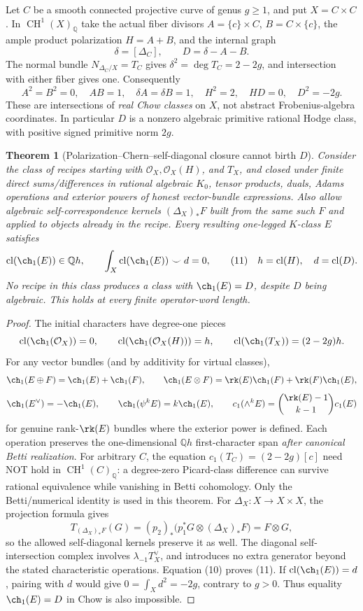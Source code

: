 \documentclass[11pt]{article}
\newcommand{\Q}{\mathbb Q}
\newcommand{\cl}{\operatorname{cl}}
\newcommand{\CH}{\operatorname{CH}}
\newtheorem{theorem}{Theorem}
\begin{document}
Let \(C\) be a smooth connected projective curve of genus
\(g\geq1\), and put \(X=C\times C\).
In \(\CH^1(X)_\Q\) take the actual fiber divisors
\(A=\{c\}\times C\), \(B=C\times\{c\}\), the ample
product polarization \(H=A+B\), and the internal graph
\[
  \delta=[\Delta_C],\qquad D=\delta-A-B.
\]
The normal bundle \(N_{\Delta_C/X}=T_C\) gives
\(\delta^2=\deg T_C=2-2g\), and intersection with
either fiber gives one. Consequently
\[
 A^2=B^2=0,\quad AB=1,\quad
 \delta A=\delta B=1,\quad
 H^2=2,\quad HD=0,\quad D^2=-2g.                  \tag{10}
\]
These are intersections of \emph{real Chow classes} on \(X\),
not abstract Frobenius-algebra coordinates. In particular
\(D\) is a nonzero algebraic primitive rational Hodge class,
with positive signed primitive norm \(2g\).

\begin{theorem}[Polarization--Chern--self-diagonal closure cannot birth \(D\)]
\label{th:tautological-no-go}
Consider the class of recipes starting with
\(\mathcal O_X,\mathcal O_X(H)\), and \(T_X\), and closed under finite
direct sums/differences in rational algebraic \(K_0\), tensor
products, duals, Adams operations and exterior powers of
honest vector-bundle expressions. Also allow algebraic
self-correspondence kernels \((\Delta_X)_*F\) built from the
same such \(F\) and applied to objects already in the recipe.
Every resulting one-legged \(K\)-class \(E\) satisfies
\[
       \cl(\ch_1(E))\in\Q h,\qquad
       \int_X\cl(\ch_1(E))\smile d=0,                \tag{11}
       \quad h=\cl(H),\quad d=\cl(D).
\]
No recipe in this class produces a class with
\(\ch_1(E)=D\), despite \(D\) being algebraic.
This holds at every finite operator-word length.
\end{theorem}
\begin{proof}
The initial characters have degree-one pieces
\[
 \cl(\ch_1(\mathcal O_X))=0,\qquad
 \cl(\ch_1(\mathcal O_X(H)))=h,\qquad
 \cl(\ch_1(T_X))=(2-2g)h .
\]
For any vector bundles (and by additivity for virtual classes),
\[
 \ch_1(E\oplus F)=\ch_1(E)+\ch_1(F),\qquad
 \ch_1(E\otimes F)=\rk(E)\ch_1(F)+\rk(F)\ch_1(E),
\]
\[
 \ch_1(E^\vee)=-\ch_1(E),\qquad
 \ch_1(\psi^kE)=k\ch_1(E),\qquad
 c_1(\wedge^kE)=\binom{\rk(E)-1}{k-1}c_1(E)
\]
for genuine rank-\(\rk(E)\) bundles where the exterior power
is defined. Each operation preserves the one-dimensional
\(\Q h\) first-character span \emph{after canonical Betti realization}.
For arbitrary \(C\), the equation
\(c_1(T_C)=(2-2g)[c]\) need NOT hold in
\(\CH^1(C)_\Q\): a degree-zero Picard-class difference can
survive rational equivalence while vanishing in Betti cohomology.
Only the Betti/numerical identity is used in this theorem.
For \(\Delta_X:X\to X\times X\), the projection formula gives
\[
 T_{(\Delta_X)_*F}(G)
  =(p_2)_*\bigl(p_1^*G\otimes(\Delta_X)_*F\bigr)
  =F\otimes G,                                      \tag{12}
\]
so the allowed self-diagonal kernels preserve it as well.
The diagonal self-intersection complex involves
\(\lambda_{-1}T_X^\vee\), and introduces no extra generator
beyond the stated characteristic operations.
Equation (10) proves (11).
If \(\cl(\ch_1(E))=d\), pairing with \(d\) would give
\(0=\int_X d^2=-2g\), contrary to \(g>0\).
Thus equality \(\ch_1(E)=D\) in Chow is also impossible.
\end{proof}
\end{document}

